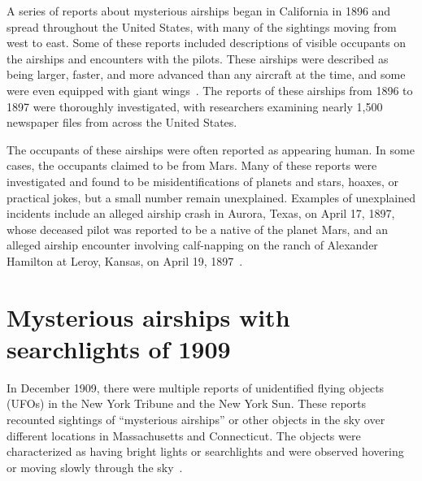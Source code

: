 A series of reports about mysterious airships began in California in 1896 and spread throughout the United States, with many of the sightings moving from west to east. Some of these reports included descriptions of visible occupants on the airships and encounters with the pilots. These airships were described as being larger, faster, and more advanced than any aircraft at the time, and some were even equipped with giant wings~\cite[p.~131,462]{Dash1997}. The reports of these airships from 1896 to 1897 were thoroughly investigated, with researchers examining nearly 1,500 newspaper files from across the United States.

The occupants of these airships were often reported as appearing human. In some cases, the occupants claimed to be from Mars. Many of these reports were investigated and found to be misidentifications of planets and stars, hoaxes, or practical jokes, but a small number remain unexplained. Examples of unexplained incidents include an alleged airship crash in Aurora, Texas, on April 17, 1897, whose deceased pilot was reported to be a native of the planet Mars, and an alleged airship encounter involving calf-napping on the ranch of Alexander Hamilton at Leroy, Kansas, on April 19, 1897~\cite{Sanarov-81}.





\section{Mysterious airships with searchlights of 1909}
\label{2023-UFO-part-History-chapter-pre-1945-mawsl1909}


In December 1909, there were multiple reports of unidentified flying objects (UFOs) in the New York Tribune and the New York Sun. These reports recounted sightings of ``mysterious airships'' or other objects in the sky over different locations in Massachusetts and Connecticut. The objects were characterized as having bright lights or searchlights and were observed hovering or moving slowly through the sky~\cite[New~Lands, Chapter 15]{Fort1975-vd}.





